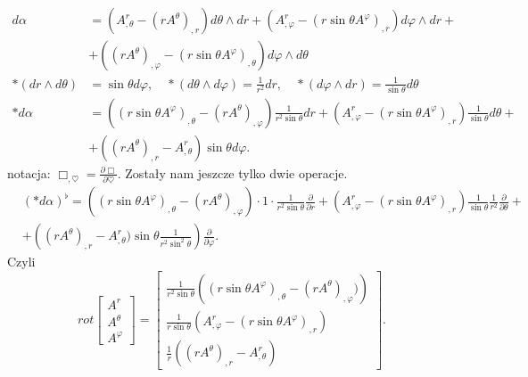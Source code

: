 \documentclass[../main.tex]{subfiles}
\begin{document}
\begin{przyklad}
        \begin{align*}
            d\alpha &= \left( A^r_{,\theta} - (rA^\theta)_{,r}  \right) d\theta \land dr + \left( A^r_{,\varphi} - (r\sin\theta A^\varphi)_{,r} \right) d\varphi \land dr +\\
            &+ \left( (rA^\theta)_{,\varphi} - (r\sin\theta A^\varphi)_{,\theta} \right) d\varphi \land d\theta\\
            \ast(dr\land d\theta) &= \sin\theta d\varphi,\quad \ast(d\theta\land d\varphi) = \frac{1}{r^2}dr,\quad \ast(d\varphi\land dr) = \frac{1}{\sin\theta}d\theta\\
            \ast d\alpha &= \left( (r \sin\theta A^\varphi)_{,\theta} - (rA^\theta)_{,\varphi} \right)\frac{1}{r^2\sin\theta} dr + \left( A^r_{,\varphi} - (r\sin\theta A^\varphi)_{,r} \right) \frac{1}{\sin\theta} d\theta + \\
        & + \left( (rA^\theta)_{,r} - A^r_{,\theta} \right) \sin\theta d\varphi
    .\end{align*}
    notacja: $\Box_{,\heartsuit} = \frac{\partial \Box}{\partial \heartsuit}$. Zostały nam jeszcze tylko dwie operacje.
    \begin{align*}
        &\left( \ast d\alpha \right) ^\flat = \left( (r\sin\theta A^\varphi)_{,\theta} - (r A^\theta)_{,\varphi}\right) \cdot 1\cdot \frac{1}{r^2\sin\theta} \frac{\partial }{\partial r} + \left( A^r_{,\varphi} - (r \sin\theta A^\varphi)_{,r}\right) \frac{1}{\sin\theta} \frac{1}{r^2} \frac{\partial }{\partial \theta} +\\
        &+ \left( (r A^\theta)_{,r} - A^r_{,\theta})\sin\theta \frac{1}{r^2\sin^2\theta} \right) \frac{\partial }{\partial \varphi}
    .\end{align*}
    Czyli
    \[
    rot \begin{bmatrix} A^r \\ A^\theta \\ A^\varphi \end{bmatrix} =
    \begin{bmatrix} \frac{1}{r^2\sin\theta} \left( (r\sin\theta A^\varphi)_{,\theta} - (r A^\theta)_{,\varphi}) \right) \\
    \frac{1}{r\sin\theta} \left( A^r_{,\varphi} - (r\sin\theta A^\varphi)_{,r} \right) \\
\frac{1}{r} \left( (r A^\theta)_{,r} - A^r_{,\theta} \right) \end{bmatrix}
    .\]
\end{przyklad}
\end{document}
